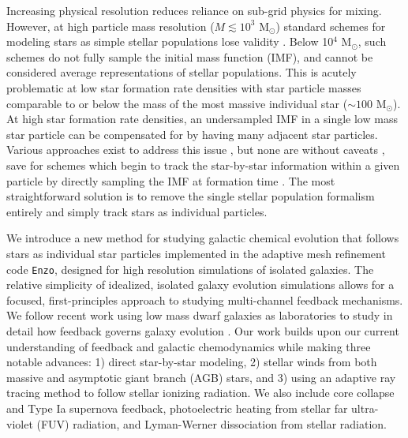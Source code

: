 Increasing physical resolution reduces reliance on sub-grid physics for mixing.  However, at high particle mass resolution ($M \lesssim 10^3$ M$_{\odot}$) standard schemes for modeling stars as simple stellar populations lose validity  \citep[as studied in detail by][]{Revaz2016}. Below 10$^4$ M$_{\odot}$, such schemes do not fully sample the initial mass function (IMF), and cannot be considered average representations of stellar populations. This is acutely problematic at low star formation rate densities with star particle masses comparable to or below the mass of the most massive individual star ($\sim 100$ M$_{\odot}$). At high star formation rate densities, an undersampled IMF in a single low mass star particle can be compensated for by having many adjacent star particles. Various approaches exist to address this issue \citep[e.g.][]{Kobayashi2000,WeidnerKroupa2004,Pflamm-AltenburgKroupa2006,RevazJablonka2012,Kroupa2013,Rosdahl2015,Su2018}, but none are without caveats \citep{Revaz2016}, save for schemes which begin to track the star-by-star information within a given particle by directly sampling the IMF at formation time \citep[e.g.][]{Hu2017}. The most straightforward solution is to remove the single stellar population formalism entirely and simply track stars as individual particles.

We introduce a new method for studying galactic chemical evolution that follows stars as individual star particles implemented in the adaptive mesh refinement code \texttt{Enzo}, designed for high resolution simulations of isolated galaxies. The relative simplicity of idealized, isolated galaxy evolution simulations allows for a focused, first-principles approach to studying multi-channel feedback mechanisms. We follow recent work using low mass dwarf galaxies as laboratories to study in detail how feedback governs galaxy evolution \citep{Forbes2016,Hu2016,Hu2017}.
Our work builds upon our current understanding of feedback and galactic chemodynamics while making three notable advances: 1) direct star-by-star modeling, 2) stellar winds from both massive and asymptotic giant branch (AGB) stars, and 3) using an adaptive ray tracing method to follow stellar ionizing radiation. We also include core collapse and Type Ia supernova feedback, photoelectric heating from stellar far ultra-violet (FUV) radiation, and Lyman-Werner dissociation from stellar radiation.

